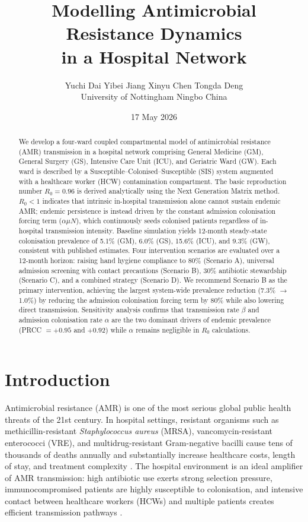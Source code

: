 \documentclass[12pt,a4paper]{article}
\title{\textbf{Modelling Antimicrobial Resistance Dynamics\\in a Hospital Network}}
\author{%
  Yuchi Dai \quad Yibei Jiang \quad Xinyu Chen \quad Tongda Deng \\[0.4em]
  {\small University of Nottingham Ningbo China}
}
\date{17 May 2026}
\begin{document}
\hypersetup{pageanchor=false}
\begin{titlepage}
  \maketitle
  \thispagestyle{empty}
  \vfill
\end{titlepage}
\clearpage
\hypersetup{pageanchor=true}
\setcounter{page}{1}

\begin{abstract}
We develop a four-ward coupled compartmental model of antimicrobial resistance (AMR) transmission in a hospital network comprising General Medicine (GM), General Surgery (GS), Intensive Care Unit (ICU), and Geriatric Ward (GW). Each ward is described by a Susceptible--Colonised--Susceptible (SIS) system augmented with a healthcare worker (HCW) contamination compartment. The basic reproduction number $R_0 = 0.96$ is derived analytically using the Next Generation Matrix method. $R_0 < 1$ indicates that intrinsic in-hospital transmission alone cannot sustain endemic AMR; endemic persistence is instead driven by the constant admission colonisation forcing term ($\alpha \mu N$), which continuously seeds colonised patients regardless of in-hospital transmission intensity. Baseline simulation yields 12-month steady-state colonisation prevalence of 5.1\% (GM), 6.0\% (GS), 15.6\% (ICU), and 9.3\% (GW), consistent with published estimates. Four intervention scenarios are evaluated over a 12-month horizon: raising hand hygiene compliance to 80\% (Scenario A), universal admission screening with contact precautions (Scenario B), 30\% antibiotic stewardship (Scenario C), and a combined strategy (Scenario D). We recommend Scenario B as the primary intervention, achieving the largest system-wide prevalence reduction (7.3\% $\to$ 1.0\%) by reducing the admission colonisation forcing term by 80\% while also lowering direct transmission. Sensitivity analysis confirms that transmission rate $\beta$ and admission colonisation rate $\alpha$ are the two dominant drivers of endemic prevalence (PRCC $= +0.95$ and $+0.92$) while $\alpha$ remains negligible in $R_0$ calculations.
\end{abstract}

\section{Introduction}

Antimicrobial resistance (AMR) is one of the most serious global public health threats of the 21st century. In hospital settings, resistant organisms such as methicillin-resistant \textit{Staphylococcus aureus} (MRSA), vancomycin-resistant enterococci (VRE), and multidrug-resistant Gram-negative bacilli cause tens of thousands of deaths annually and substantially increase healthcare costs, length of stay, and treatment complexity \cite{lipsitch2000,webb2005}. The hospital environment is an ideal amplifier of AMR transmission: high antibiotic use exerts strong selection pressure, immunocompromised patients are highly susceptible to colonisation, and intensive contact between healthcare workers (HCWs) and multiple patients creates efficient transmission pathways \cite{bootsma_preprint,dagata2007}.
\end{document}
